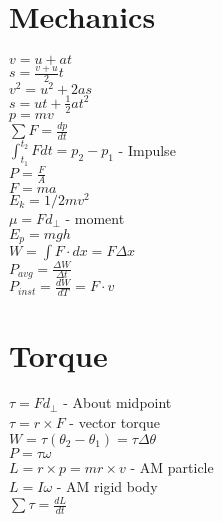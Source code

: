 \begin{multicols}{2}
    \setlength{\premulticols}{1pt}
    \setlength{\postmulticols}{1pt}
    \setlength{\multicolsep}{3pt}
    \setlength{\columnsep}{3pt}
    
    
    
    \chapter{Mechanics}
        $v=u+at$    \\
        $s=\frac{v+u}{2}t$ \\
        $v^2=u^2+2as$      \\
        $s=ut+\frac{1}{2}at^2$  \\
        $p=mv$    \\
        $\sum F= \frac{dp}{dt}$  \\
        $\int_{t_1}^{t_2}Fdt=p_2-p_1$ - Impulse \\
        $P=\frac{F}{A}$ \\
        $F=ma$\\
        $E_k=1/2mv^2$ \\
        $\mu=Fd_\perp$ - moment \\
        $E_p=mgh$\\
        $W=\int F \cdot dx=F\Delta x$\\
        $P_{avg}=\frac{\Delta W}{\Delta t}$\\
        $P_{inst}=\frac{dW}{dT}=F\cdot v$\\

        \chapter{Torque}
        $\tau=Fd_{\perp}$ - About midpoint\\
        $\tau=r \times F$ - vector torque\\
        $W=\tau(\theta_2-\theta_1)=\tau \Delta \theta$\\
        $P=\tau\omega$\\
        $L=r\times p=m r \times v $ - AM particle\\
        $L=I\omega$ -  AM rigid body\\
        $\sum \tau=\frac{dL}{dt}$\\


\end{multicols}

